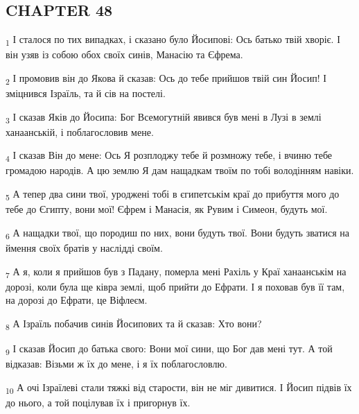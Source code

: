 \subsection{CHAPTER 48}
\begin{tcolorbox}
\textsubscript{1} І сталося по тих випадках, і сказано було Йосипові: Ось батько твій хворіє. І він узяв із собою обох своїх синів, Манасію та Єфрема.
\end{tcolorbox}
\begin{tcolorbox}
\textsubscript{2} І промовив він до Якова й сказав: Ось до тебе прийшов твій син Йосип! І зміцнився Ізраїль, та й сів на постелі.
\end{tcolorbox}
\begin{tcolorbox}
\textsubscript{3} І сказав Яків до Йосипа: Бог Всемогутній явився був мені в Лузі в землі ханаанській, і поблагословив мене.
\end{tcolorbox}
\begin{tcolorbox}
\textsubscript{4} І сказав Він до мене: Ось Я розплоджу тебе й розмножу тебе, і вчиню тебе громадою народів. А цю землю Я дам нащадкам твоїм по тобі володінням навіки.
\end{tcolorbox}
\begin{tcolorbox}
\textsubscript{5} А тепер два сини твої, уроджені тобі в єгипетськім краї до прибуття мого до тебе до Єгипту, вони мої! Єфрем і Манасія, як Рувим і Симеон, будуть мої.
\end{tcolorbox}
\begin{tcolorbox}
\textsubscript{6} А нащадки твої, що породиш по них, вони будуть твої. Вони будуть зватися на ймення своїх братів у наслідді своїм.
\end{tcolorbox}
\begin{tcolorbox}
\textsubscript{7} А я, коли я прийшов був з Падану, померла мені Рахіль у Краї ханаанськім на дорозі, коли була ще ківра землі, щоб прийти до Ефрати. І я поховав був її там, на дорозі до Ефрати, це Віфлеєм.
\end{tcolorbox}
\begin{tcolorbox}
\textsubscript{8} А Ізраїль побачив синів Йосипових та й сказав: Хто вони?
\end{tcolorbox}
\begin{tcolorbox}
\textsubscript{9} І сказав Йосип до батька свого: Вони мої сини, що Бог дав мені тут. А той відказав: Візьми ж їх до мене, і я їх поблагословлю.
\end{tcolorbox}
\begin{tcolorbox}
\textsubscript{10} А очі Ізраїлеві стали тяжкі від старости, він не міг дивитися. І Йосип підвів їх до нього, а той поцілував їх і пригорнув їх.
\end{tcolorbox}
